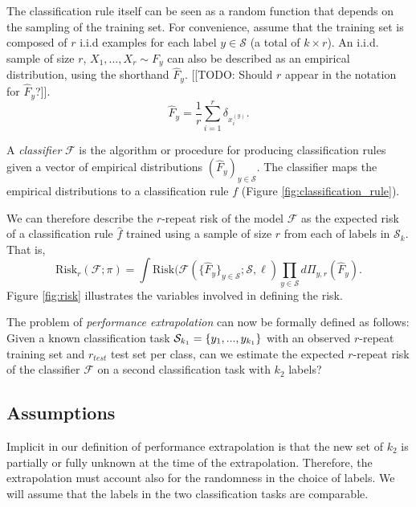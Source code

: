 \documentclass[12pt]{article}
\begin{document}
The classification rule itself can be seen as a random function that
depends on the sampling of the training set. For convenience, assume
that the training set is composed of $r$ i.i.d examples for
each label $y \in \mathcal{S}$ (a total of $k\times r$).  An
i.i.d. sample of size $r$, $X_1,\hdots, X_r \sim F_y$ can also be
described as an empirical distribution, using the shorthand
$\hat{F}_y$. [[TODO: Should $r$ appear in the notation for $\hat{F}_y$?]].
\[\hat{F}_y = \frac{1}{r}\sum_{i=1}^r \delta_{x_i^{(y)}}.\]


A \emph{classifier} $\mathcal{F}$ is the algorithm or procedure for
producing classification rules given a vector of empirical
distributions $(\hat{F}_y)_{y\in \mathcal{S}}$.  The classifier maps
the empirical distributions to a classification rule $f$
(Figure \ref{fig:classification_rule}).

We can therefore describe the $r$-repeat risk of the model $\mathcal{F}$
as the expected risk of a classification rule $\hat{f}$ trained 
using a sample of size $r$ from each of labels in $\mathcal{S}_k$.
That is,
\[
\text{Risk}_r(\mathcal{F}; \pi) =
\int \text{Risk}(\mathcal{F}(\{\hat{F}_y\}_{y \in \mathcal{S}}; \mathcal{S}, \ell) \prod_{y \in \mathcal{S}} d\Pi_{y, r}(\hat{F}_y).
\]
Figure \ref{fig:risk} illustrates the variables involved in defining
the risk.

The problem of \emph{performance extrapolation} can now be formally
defined as follows: Given a known classification task
$\mathcal{S}_{k_1}=\{y_1,...,y_{k_1}\}$ with an observed $r$-repeat training set
and $r_{test}$ test set per class, can we estimate the expected
$r$-repeat risk of the classifier $\mathcal{F}$ on a second
classification task with $k_2$ labels?

\subsection{Assumptions}

Implicit in our definition of performance extrapolation is that the
new set of $k_2$ is partially or fully unknown at the time of the
extrapolation. Therefore, the extrapolation must account also for the
randomness in the choice of labels. We will assume that the labels in
the two classification tasks are comparable.
\end{document}
